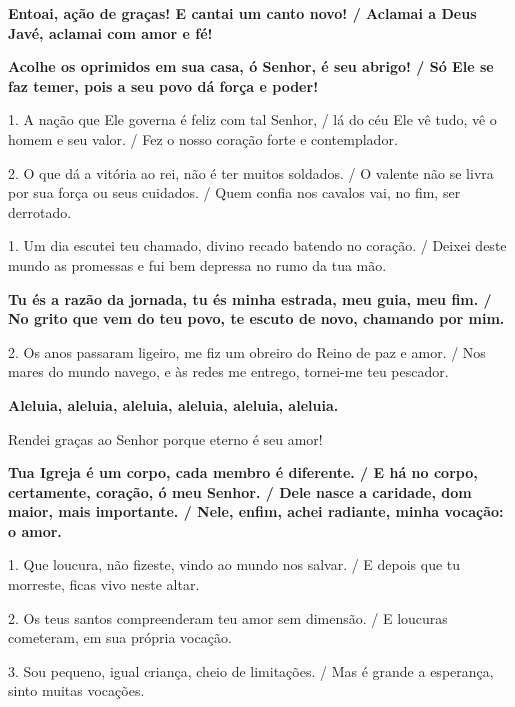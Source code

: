 \documentclass[a5paper,9pt]{extarticle}
\begin{document}
\begin{cantos}
\begin{canto}
\textbf{Entoai, ação de graças! E cantai um canto novo! / Aclamai a Deus Javé, aclamai com amor e fé!}
\end{canto}

\begin{canto}
\textbf{Acolhe os oprimidos em sua casa, ó Senhor, é seu abrigo! / Só Ele se faz temer, pois a seu povo dá força e poder!}

1. A nação que Ele governa é feliz com tal Senhor, / lá do céu Ele vê tudo, vê o homem e seu valor. / Fez o nosso coração forte e contemplador.

2. O que dá a vitória ao rei, não é ter muitos soldados. / O valente não se livra por sua força ou seus cuidados. / Quem confia nos cavalos vai, no fim, ser derrotado.
\end{canto}

\begin{canto}
1. Um dia escutei teu chamado, divino recado batendo no coração. / Deixei deste mundo as promessas e fui bem depressa no rumo da tua mão.

\textbf{Tu és a razão da jornada, tu és minha estrada, meu guia, meu fim. / No grito que vem do teu povo, te escuto de novo, chamando por mim.}

2. Os anos passaram ligeiro, me fiz um obreiro do Reino de paz e amor. / Nos mares do mundo navego, e às redes me entrego, tornei-me teu pescador.
\end{canto}

\begin{canto}
\textbf{Aleluia, aleluia, aleluia, aleluia, aleluia, aleluia. }

Rendei graças ao Senhor porque eterno é seu amor! 
\end{canto}

\begin{canto}
\textbf{Tua Igreja é um corpo, cada membro é diferente. / E há no corpo, certamente, coração, ó meu Senhor. / Dele nasce a caridade, dom maior, mais importante. / Nele, enfim, achei radiante, minha vocação: o amor.}

1. Que loucura, não fizeste, vindo ao mundo nos salvar. / E depois que tu morreste, ficas vivo neste altar.

2. Os teus santos compreenderam teu amor sem dimensão. / E loucuras cometeram, em sua própria vocação.

3. Sou pequeno, igual criança, cheio de limitações. / Mas é grande a esperança, sinto muitas vocações.
\end{canto}


\end{cantos}
\end{document}
